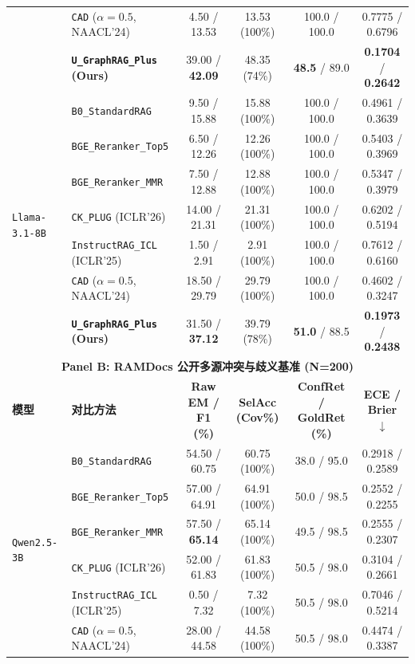\documentclass[11pt]{article}
\begin{document}
\begin{table}[t]
{{\begin{tabular}{llcccc}
& \texttt{CAD} ($\alpha=0.5$, NAACL'24) & 4.50 / 13.53 & 13.53 (100\%) & 100.0 / 100.0 & 0.7775 / 0.6796 \\
& \textbf{\texttt{U\_GraphRAG\_Plus} (Ours)} & 39.00 / \textbf{42.09} & 48.35 (74\%) & \textbf{48.5} / 89.0 & \textbf{0.1704} / \textbf{0.2642} \\
\midrule
\multirow{7}{*}{\texttt{Llama-3.1-8B}}
& \texttt{B0\_StandardRAG} & 9.50 / 15.88 & 15.88 (100\%) & 100.0 / 100.0 & 0.4961 / 0.3639 \\
& \texttt{BGE\_Reranker\_Top5} & 6.50 / 12.26 & 12.26 (100\%) & 100.0 / 100.0 & 0.5403 / 0.3969 \\
& \texttt{BGE\_Reranker\_MMR} & 7.50 / 12.88 & 12.88 (100\%) & 100.0 / 100.0 & 0.5347 / 0.3979 \\
& \texttt{CK\_PLUG} (ICLR'26) & 14.00 / 21.31 & 21.31 (100\%) & 100.0 / 100.0 & 0.6202 / 0.5194 \\
& \texttt{InstructRAG\_ICL} (ICLR'25) & 1.50 / 2.91 & 2.91 (100\%) & 100.0 / 100.0 & 0.7612 / 0.6160 \\
& \texttt{CAD} ($\alpha=0.5$, NAACL'24) & 18.50 / 29.79 & 29.79 (100\%) & 100.0 / 100.0 & 0.4602 / 0.3247 \\
& \textbf{\texttt{U\_GraphRAG\_Plus} (Ours)} & 31.50 / \textbf{37.12} & 39.79 (78\%) & \textbf{51.0} / 88.5 & \textbf{0.1973} / \textbf{0.2438} \\
\midrule
\midrule
\multicolumn{6}{c}{\textbf{Panel B: RAMDocs 公开多源冲突与歧义基准 (N=200)}} \\
\midrule
\textbf{模型} & \textbf{对比方法} & \textbf{Raw EM / F1 (\%)} & \textbf{SelAcc (Cov\%)} & \textbf{ConfRet / GoldRet (\%)} & \textbf{ECE / Brier $\downarrow$} \\
\midrule
\multirow{7}{*}{\texttt{Qwen2.5-3B}}
& \texttt{B0\_StandardRAG} & 54.50 / 60.75 & 60.75 (100\%) & 38.0 / 95.0 & 0.2918 / 0.2589 \\
& \texttt{BGE\_Reranker\_Top5} & 57.00 / 64.91 & 64.91 (100\%) & 50.0 / 98.5 & 0.2552 / 0.2255 \\
& \texttt{BGE\_Reranker\_MMR} & 57.50 / \textbf{65.14} & 65.14 (100\%) & 49.5 / 98.5 & 0.2555 / 0.2307 \\
& \texttt{CK\_PLUG} (ICLR'26) & 52.00 / 61.83 & 61.83 (100\%) & 50.5 / 98.0 & 0.3104 / 0.2661 \\
& \texttt{InstructRAG\_ICL} (ICLR'25) & 0.50 / 7.32 & 7.32 (100\%) & 50.5 / 98.0 & 0.7046 / 0.5214 \\
& \texttt{CAD} ($\alpha=0.5$, NAACL'24) & 28.00 / 44.58 & 44.58 (100\%) & 50.5 / 98.0 & 0.4474 / 0.3387 \\

\end{tabular}}}
\end{table}
\end{document}
